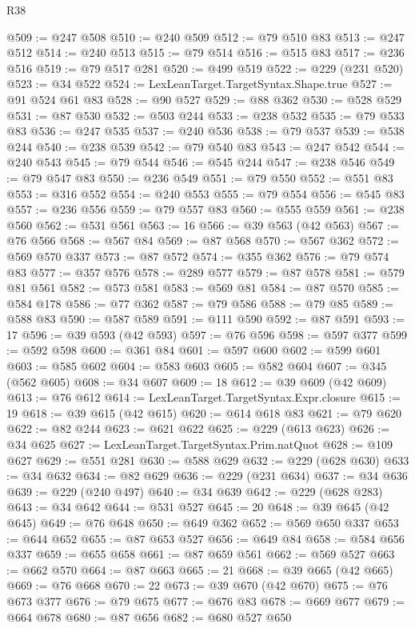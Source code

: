 \begin{lexlean}{R38}
\begin{coremodule}
@509 := @247 @508
@510 := @240 @509
@512 := @79 @510 @83
@513 := @247 @512
@514 := @240 @513
@515 := @79 @514
@516 := @515 @83
@517 := @236 @516
@519 := @79 @517 @281
@520 := @499 @519
@522 := @229 (@231 @520)
@523 := @34 @522
@524 := LexLeanTarget.TargetSyntax.Shape.true
@527 := @91 @524 @61 @83
@528 := @90 @527
@529 := @88 @362
@530 := @528 @529
@531 := @87 @530
@532 := @503 @244
@533 := @238 @532
@535 := @79 @533 @83
@536 := @247 @535
@537 := @240 @536
@538 := @79 @537
@539 := @538 @244
@540 := @238 @539
@542 := @79 @540 @83
@543 := @247 @542
@544 := @240 @543
@545 := @79 @544
@546 := @545 @244
@547 := @238 @546
@549 := @79 @547 @83
@550 := @236 @549
@551 := @79 @550
@552 := @551 @83
@553 := @316 @552
@554 := @240 @553
@555 := @79 @554
@556 := @545 @83
@557 := @236 @556
@559 := @79 @557 @83
@560 := @555 @559
@561 := @238 @560
@562 := @531 @561
@563 := 16
@566 := @39 @563 (@42 @563)
@567 := @76 @566
@568 := @567 @84
@569 := @87 @568
@570 := @567 @362
@572 := @569 @570 @337
@573 := @87 @572
@574 := @355 @362
@576 := @79 @574 @83
@577 := @357 @576
@578 := @289 @577
@579 := @87 @578
@581 := @579 @81 @561
@582 := @573 @581
@583 := @569 @81
@584 := @87 @570
@585 := @584 @178
@586 := @77 @362
@587 := @79 @586
@588 := @79 @85
@589 := @588 @83
@590 := @587 @589
@591 := @111 @590
@592 := @87 @591
@593 := 17
@596 := @39 @593 (@42 @593)
@597 := @76 @596
@598 := @597 @377
@599 := @592 @598
@600 := @361 @84
@601 := @597 @600
@602 := @599 @601
@603 := @585 @602
@604 := @583 @603
@605 := @582 @604
@607 := @345 (@562 @605)
@608 := @34 @607
@609 := 18
@612 := @39 @609 (@42 @609)
@613 := @76 @612
@614 := LexLeanTarget.TargetSyntax.Expr.closure
@615 := 19
@618 := @39 @615 (@42 @615)
@620 := @614 @618 @83
@621 := @79 @620
@622 := @82 @244
@623 := @621 @622
@625 := @229 (@613 @623)
@626 := @34 @625
@627 := LexLeanTarget.TargetSyntax.Prim.natQuot
@628 := @109 @627
@629 := @551 @281
@630 := @588 @629
@632 := @229 (@628 @630)
@633 := @34 @632
@634 := @82 @629
@636 := @229 (@231 @634)
@637 := @34 @636
@639 := @229 (@240 @497)
@640 := @34 @639
@642 := @229 (@628 @283)
@643 := @34 @642
@644 := @531 @527
@645 := 20
@648 := @39 @645 (@42 @645)
@649 := @76 @648
@650 := @649 @362
@652 := @569 @650 @337
@653 := @644 @652
@655 := @87 @653 @527
@656 := @649 @84
@658 := @584 @656 @337
@659 := @655 @658
@661 := @87 @659 @561
@662 := @569 @527
@663 := @662 @570
@664 := @87 @663
@665 := 21
@668 := @39 @665 (@42 @665)
@669 := @76 @668
@670 := 22
@673 := @39 @670 (@42 @670)
@675 := @76 @673 @377
@676 := @79 @675
@677 := @676 @83
@678 := @669 @677
@679 := @664 @678
@680 := @87 @656
@682 := @680 @527 @650

\end{coremodule}
\end{lexlean}
